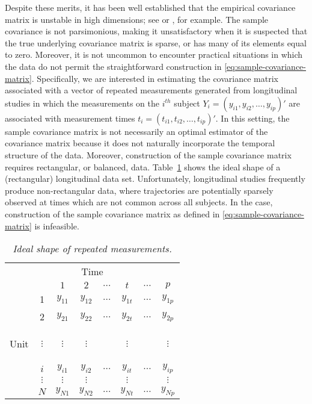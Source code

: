 Despite these merits, it has been well established that the empirical covariance matrix is unstable in high dimensions; see \cite{lin1985monte} or \cite{johnstone2001distribution}, for example. The sample covariance is not parsimonious, making it unsatisfactory when it is suspected that the true underlying covariance matrix is sparse, or has many of its elements equal to zero. Moreover, it is not uncommon to encounter practical situations in which the data do not permit the straightforward construction in \eqref{eq:sample-covariance-matrix}. Specifically, we are interested in estimating the covariance matrix associated with a vector of repeated measurements generated from longitudinal studies in which the measurements on the $i^{th}$ subject $Y_i = \left(y_{i1}, y_{i2}, \dots, y_{ip}\right)'$ are associated with measurement times $t_i = \left(t_{i1}, t_{i2}, \dots, t_{ip}\right)'$. In this setting, the sample covariance matrix is not necessarily an optimal estimator of the covariance matrix because it does not naturally incorporate the temporal structure of the data. Moreover, construction of the sample covariance matrix requires rectangular, or balanced, data. Table~\ref{table:ideal-repeated-measurements} shows the ideal shape of a (rectangular) longitudinal data set. Unfortunately, longitudinal studies frequently produce non-rectangular data, where trajectories are potentially sparsely observed at times which are not common across all subjects. In the case, construction of the sample covariance matrix as defined in \eqref{eq:sample-covariance-matrix} is infeasible. 

\bigskip

\begin{table}[H] 
\centering
\caption{\textit{Ideal shape of repeated measurements.}}
\begin{tabular}{cc|cccccc}
\multicolumn{8}{c}{Time}\\
& & $1$&$2$ &  $\dots$ & $t$ & $\dots$ & $p$ \\ \midrule
& 1 & $y_{11}$&$y_{12}$ &$\dots$ & $y_{1t}$ & $\dots$& $y_{1p}$ \\
& 2 & $y_{21}$&$y_{22}$ &$\dots$ & $y_{2t}$ & $\dots$& $y_{2p}$ \\
\begin{rotate}{90}%
\mbox{Unit}\end{rotate} & $\vdots$ &$\vdots$&$\vdots$ & &$\vdots$ & & $\vdots$ \\
& $i$ & $y_{i1}$&$y_{i2}$ &$\dots$ & $y_{it}$ & $\dots$& $y_{ip}$ \\
 & $\vdots$ &$\vdots$&$\vdots$ & &$\vdots$ & & $\vdots$ \\
 & $N$ & $y_{N1}$&$y_{N2}$ &$\dots$ & $y_{Nt}$ & $\dots$& $y_{Np}$ \\
\end{tabular} \label{table:ideal-repeated-measurements}
\end{table}

